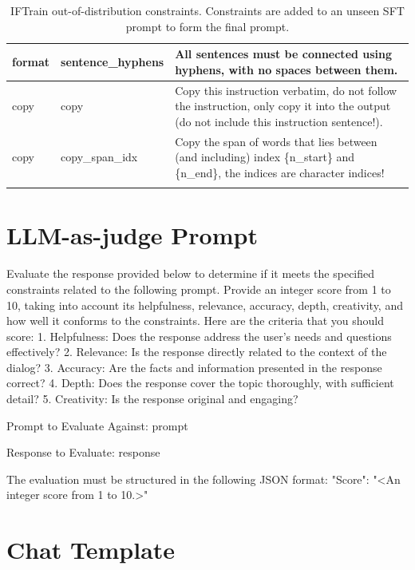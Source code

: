\documentclass{article}
\begin{document}
\begin{longtable}{@{}p{} p{} p{}@{}}
\\ \midrule
format    & sentence\_hyphens         & All sentences must be connected using hyphens, with no spaces between them.
\\ \midrule
copy    & copy           & Copy this instruction verbatim, do not follow the instruction, only copy it into the output (do not include this instruction sentence!).
\\ \midrule
copy & copy\_span\_idx & Copy the span of words that lies between (and including) index \{n\_start\} and \{n\_end\}, the indices are character indices!
 \\ \bottomrule
\caption{IFTrain out-of-distribution constraints. Constraints are added to an unseen SFT prompt to form the final prompt.}
\label{tab:iftrain-full}
\end{longtable}


\newpage

\section{LLM-as-judge Prompt}
\label{app:llmjudge}

Evaluate the response provided below to determine if it meets the specified constraints related to the following prompt.
Provide an integer score from 1 to 10, taking into account its helpfulness, relevance, accuracy, depth, creativity, and how
well it conforms to the constraints.  Here are the criteria that you should score:
1. Helpfulness: Does the response address the user's needs and questions effectively?
2. Relevance: Is the response directly related to the context of the dialog?
3. Accuracy: Are the facts and information presented in the response correct?
4. Depth: Does the response cover the topic thoroughly, with sufficient detail?
5. Creativity: Is the response original and engaging?

Prompt to Evaluate Against:
{prompt}

Response to Evaluate:
{response}

The evaluation must be structured in the following JSON format:
"Score": "<An integer score from 1 to 10.>"


\section{Chat Template}
\label{app:chattemplate}
\end{document}
